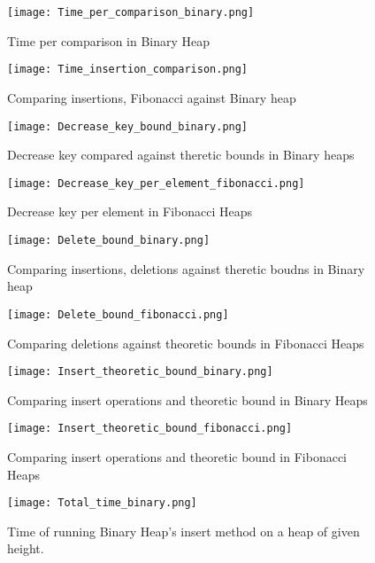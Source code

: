 \documentclass[a4paper,10pt]{article}
\begin{document}
\begin{figure}[h]    
  \texttt{[image: Time\_per\_comparison\_binary.png]}
  \caption{Time per comparison in Binary Heap}
  \label{timepercompbin}
\end{figure}

\begin{figure}[h]    
  \texttt{[image: Time\_insertion\_comparison.png]}
  \caption{Comparing insertions, Fibonacci against Binary heap}
  \label{timeinscomp}
\end{figure}

\begin{figure}[h]    
  \texttt{[image: Decrease\_key\_bound\_binary.png]}
  \caption{Decrease key compared against theretic bounds in Binary heaps}
  \label{binary-decrease-key-graph}
\end{figure}

\begin{figure}[h]   
  \texttt{[image: Decrease\_key\_per\_element\_fibonacci.png]}
  \caption{Decrease key per element in Fibonacci Heaps}
  \label{fibonacci-decrease-key-per-element}
\end{figure}

\begin{figure}[h]    
  \texttt{[image: Delete\_bound\_binary.png]}
  \caption{Comparing insertions, deletions against theretic boudns in Binary heap}
  \label{delboundbin}
\end{figure}

\begin{figure}[h]    
  \texttt{[image: Delete\_bound\_fibonacci.png]}
  \caption{Comparing deletions against theoretic bounds in Fibonacci Heaps}
  \label{fibonacci-delete-min-graph}
\end{figure}

\begin{figure}[h]    
  \texttt{[image: Insert\_theoretic\_bound\_binary.png]}
  \caption{Comparing insert operations and theoretic bound in Binary Heaps}
  \label{binary-insert-accumulative-graph}
\end{figure}

\begin{figure}[h]    
  \texttt{[image: Insert\_theoretic\_bound\_fibonacci.png]}
  \caption{Comparing insert operations and theoretic bound in Fibonacci Heaps}
  \label{instheoreticboundfib}
\end{figure}

\begin{figure}[h]   
  \texttt{[image: Total\_time\_binary.png]}
  \caption{Time of running Binary Heap's insert method on a heap of given height.}
  \label{timeinsbin}
\end{figure}
\end{document}
